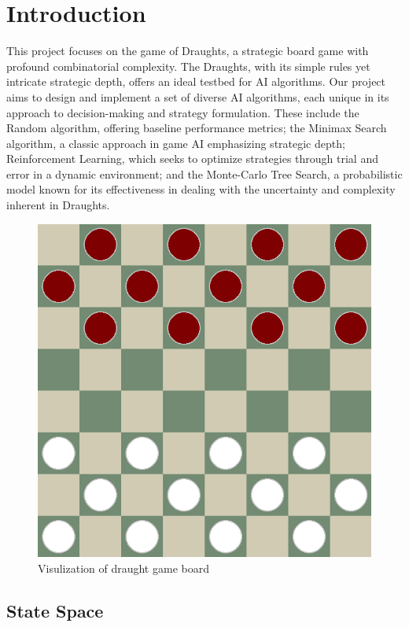 \section{Introduction}
This project focuses on the game of Draughts, a strategic board game with profound combinatorial complexity. The Draughts, with its simple rules yet intricate strategic depth, offers an ideal testbed for AI algorithms. Our project aims to design and implement a set of diverse AI algorithms, each unique in its approach to decision-making and strategy formulation. These include the Random algorithm, offering baseline performance metrics; the Minimax Search algorithm, a classic approach in game AI emphasizing strategic depth; Reinforcement Learning, which seeks to optimize strategies through trial and error in a dynamic environment; and the Monte-Carlo Tree Search, a probabilistic model known for its effectiveness in dealing with the uncertainty and complexity inherent in Draughts.

\begin{figure}[t]
    \centering
    \includegraphics[width=\linewidth]{figures/board.png}
    \caption{Visulization of draught game board}
    \label{fig:board}
\end{figure}

\subsection{State Space}

